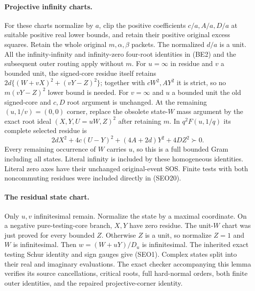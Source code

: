 \paragraph{Projective infinity charts.}
For these charts normalize by $a$, clip the positive coefficients
$c/a,A/a,D/a$ at suitable positive real lower bounds, and retain
their positive original excess squares. Retain the whole original
$m,\alpha,\beta$ packets. The normalized $d/a$ is a unit.
All the infinity-infinity and infinity-zero four-root identities
in (BE2) and the subsequent outer routing apply without $m$.
For $u=\infty$ in residue and $v$ a bounded unit, the signed-core
residue itself retains
$2d\{(W+vX)^2+(vY-Z)^2\}$; together with $cW^2,AY^2$ it is
strict, so no $m(vY-Z)^2$ lower bound is needed.
For $v=\infty$ and $u$ a bounded unit the old signed-core and
$c,D$ root argument is unchanged.
At the remaining $(u,1/v)=(0,0)$ corner, replace the obsolete
state-$W$ mass argument by the exact root ideal
$(X,Y,U=uW,Z)^2$ after retaining $m$. In $q^2F(u,1/q)$ its
complete selected residue is
\[
 2dX^2+4c(U-Y)^2+(4A+2d)Y^2+4DZ^2\succ0.
 \tag{SEO19}
\]
Every remaining occurrence of $W$ carries $u$, so this is a full
bounded Gram including all states. Literal infinity is included
by these homogeneous identities. Literal zero axes have their
unchanged original-event SOS. Finite tests with both noncommuting
residues were included directly in (SEO20).

\paragraph{The residual state chart.}
Only $u,v$ infinitesimal remain. Normalize the state by a maximal
coordinate. On a negative pure-testing-core branch, $X,Y$ have
zero residue. The unit-$W$ chart was just proved for every bounded
$Z$. Otherwise $Z$ is a unit, so normalize $Z=1$ and $W$ is
infinitesimal. Then $w=(W+uY)/D_u$ is infinitesimal. The inherited
exact testing Schur identity and sign gauges give (SEO1).
Complex states split into their real and imaginary evaluations.
The exact checker accompanying this lemma verifies its source
cancellations, critical roots, full hard-normal orders, both finite
outer identities, and the repaired projective-corner identity.
